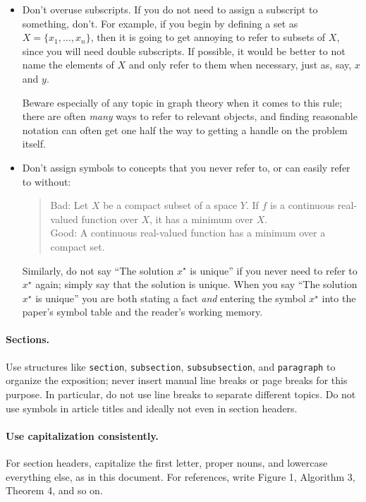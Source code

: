 \documentclass[12pt]{article}
\begin{document}
\begin{itemize}
\item Don't overuse subscripts. If you do not need to assign a subscript
to something, don't. For example, if you begin by defining a set as
$X = \{x_1, \dots, x_n\}$, then it is going to get annoying to refer to subsets
of $X$, since you will need double subscripts. If possible, it would be better
to not name the elements of $X$ and only refer to them when necessary, just
as, say, $x$ and $y$. 

Beware especially of any topic in graph theory when it comes to this rule;
there are often \emph{many} ways to refer to relevant objects, and finding
reasonable notation can often get one half the way to getting a handle on the
problem itself.

\item Don't assign symbols to concepts that you never refer to, or can easily
refer to without:
\begin{quote}
Bad: Let $X$ be a compact subset of a space $Y$. If $f$ is a continuous
real-valued function over $X$, it has a minimum over $X$. \\
Good: A continuous real-valued function has a minimum over a compact set.
\end{quote}
Similarly, do not say ``The solution $x^\star$ is unique'' if you never need
to refer to $x^\star$ again; simply say that the solution is unique.
When you say ``The solution $x^\star$ is unique'' you are both stating a fact
\emph{and} entering the symbol $x^\star$ into the paper's symbol table and
the reader's working memory.
\end{itemize}

\paragraph*{Sections.}
Use structures like \texttt{section}, \texttt{subsection},
\texttt{subsubsection}, and \texttt{paragraph} to organize the exposition;
never insert manual line breaks or page breaks for this purpose. In particular,
do not use line breaks to separate different topics. Do not use symbols in
article titles and ideally not even in section headers.

\paragraph{Use capitalization consistently.}
For section headers, capitalize the first letter, proper nouns, and lowercase
everything else, as in this document.  For references, write Figure 1, Algorithm 3,
Theorem 4, and so on.
\end{document}

